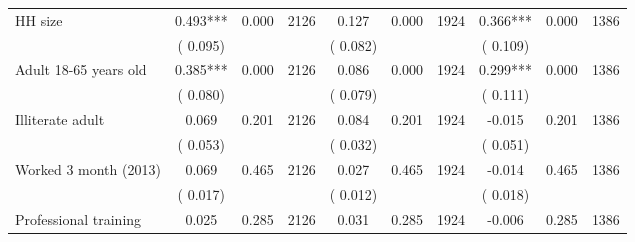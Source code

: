 \begin{tabular}{l*{9}{c}}
 HH size                 &              0.493***          &        0.000 & 2126          &              0.127 &        0.000 & 1924                   &        0.366*** &        0.000 & 1386                                 \\ 
                               &        (       0.095) & &                                                                 &       (       0.082) & &                                                          &       (       0.109) & &                                          \\ 
 Adult 18-65 years old                 &              0.385***          &        0.000 & 2126          &              0.086 &        0.000 & 1924                   &        0.299*** &        0.000 & 1386                                 \\ 
                               &        (       0.080) & &                                                                 &       (       0.079) & &                                                          &       (       0.111) & &                                          \\ 
 Illiterate adult                 &              0.069          &        0.201 & 2126          &              0.084 &        0.201 & 1924                   &       -0.015 &        0.201 & 1386                                 \\ 
                               &        (       0.053) & &                                                                 &       (       0.032) & &                                                          &       (       0.051) & &                                          \\ 
 Worked 3 month (2013)                 &              0.069          &        0.465 & 2126          &              0.027 &        0.465 & 1924                   &       -0.014 &        0.465 & 1386                                 \\ 
                               &        (       0.017) & &                                                                 &       (       0.012) & &                                                          &       (       0.018) & &                                          \\ 
 Professional training                 &              0.025          &        0.285 & 2126          &              0.031 &        0.285 & 1924                   &       -0.006 &        0.285 & 1386                                 \\ 

\end{tabular}

